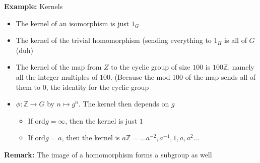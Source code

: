 \documentclass{article}
\newcommand{\Z}{\mathbb{Z}}
\begin{document}
\begin{example} 
\textbf{Example:} Kernels
\begin{itemize}
	\item The kernel of an isomorphism is just $1_G$
	\item The kernel of the trivial homomorphism (sending everything to $1_H$ is all of $G$ (duh)
	\item The kernel of the map from $Z$ to the cyclic group of size $100$ is $100\Z$, namely all the integer multiples of $100$. (Because the mod 100 of the map sends all of them to $0$, the identity for the cyclic group
	\item $\phi: \Z\to G$ by $n \mapsto g^n$. The kernel then depends on $g$
		\begin{itemize}
			\item If ord$g = \infty$, then the kernel is just $1$
			\item If ord$g = a$, then the kernel is $a\Z = {\ldots a^{-2}, a^{-1}, 1, a, a^2 \ldots}$
		\end{itemize}
\end{itemize}
\end{example}
\begin{remark} 
\textbf{Remark:}  
The image of a homomorphism forms a subgroup as well
\end{remark}
\end{document}

